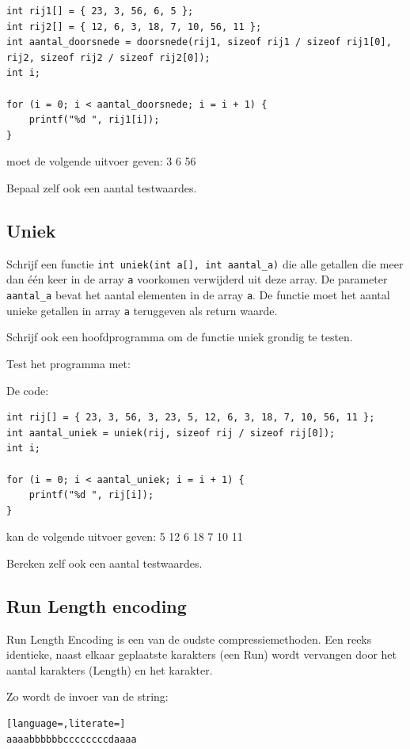 \documentclass[a4paper,10pt,fleqn,twoside]{article}
\begin{document}
\begin{lstlisting}
int rij1[] = { 23, 3, 56, 6, 5 };
int rij2[] = { 12, 6, 3, 18, 7, 10, 56, 11 }; 
int aantal_doorsnede = doorsnede(rij1, sizeof rij1 / sizeof rij1[0], rij2, sizeof rij2 / sizeof rij2[0]);
int i;

for (i = 0; i < aantal_doorsnede; i = i + 1) {
	printf("%d ", rij1[i]);
} 
\end{lstlisting}

moet de volgende uitvoer geven:
3 6 56

Bepaal zelf ook een aantal testwaardes.

\subsection{Uniek}
Schrijf een functie \lstinline|int uniek(int a[], int aantal_a)| die alle getallen die meer dan één keer in de array \lstinline|a| voorkomen verwijderd uit deze array. De parameter \lstinline|aantal_a| bevat het aantal elementen in de array \lstinline|a|. De functie moet het aantal unieke getallen in array \lstinline|a| teruggeven als return waarde.

Schrijf ook een hoofdprogramma om de functie uniek grondig te testen.

Test het programma met:

De code:

\begin{lstlisting}
int rij[] = { 23, 3, 56, 3, 23, 5, 12, 6, 3, 18, 7, 10, 56, 11 }; 
int aantal_uniek = uniek(rij, sizeof rij / sizeof rij[0]);
int i;

for (i = 0; i < aantal_uniek; i = i + 1) {
	printf("%d ", rij[i]);
} 
\end{lstlisting}

kan de volgende uitvoer geven:
5 12 6 18 7 10 11

Bereken zelf ook een aantal testwaardes.


\subsection{Run Length encoding}
Run Length Encoding is een van de oudste compressiemethoden. Een reeks identieke, naast elkaar geplaatste karakters (een Run) wordt vervangen door het aantal karakters (Length) en het karakter.

Zo wordt de invoer van de string:

\begin{lstlisting}[language=,literate=]
aaaabbbbbbccccccccdaaaa
\end{lstlisting}
\end{document}
